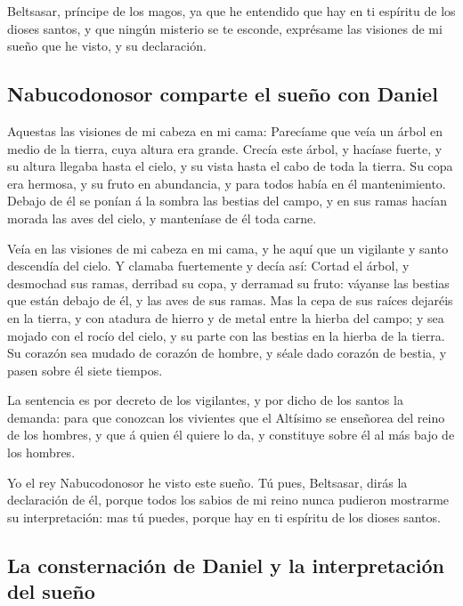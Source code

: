  Beltsasar, príncipe de los magos, ya que he entendido que
hay en ti espíritu de los dioses santos, y que ningún misterio se te
esconde, exprésame las visiones de mi sueño que he visto, y su
declaración.

\hypertarget{nabucodonosor-comparte-el-sueuxf1o-con-daniel}{%
\subsection{Nabucodonosor comparte el sueño con
Daniel}\label{nabucodonosor-comparte-el-sueuxf1o-con-daniel}}

 Aquestas las visiones de mi cabeza en mi cama: Parecíame
que veía un árbol en medio de la tierra, cuya altura era grande.
 Crecía este árbol, y hacíase fuerte, y su altura llegaba
hasta el cielo, y su vista hasta el cabo de toda la tierra.
 Su copa era hermosa, y su fruto en abundancia, y para
todos había en él mantenimiento. Debajo de él se ponían á la sombra las
bestias del campo, y en sus ramas hacían morada las aves del cielo, y
manteníase de él toda carne.

 Veía en las visiones de mi cabeza en mi cama, y he aquí
que un vigilante y santo descendía del cielo.  Y clamaba
fuertemente y decía así: Cortad el árbol, y desmochad sus ramas,
derribad su copa, y derramad su fruto: váyanse las bestias que están
debajo de él, y las aves de sus ramas.  Mas la cepa de sus
raíces dejaréis en la tierra, y con atadura de hierro y de metal entre
la hierba del campo; y sea mojado con el rocío del cielo, y su parte con
las bestias en la hierba de la tierra.  Su corazón sea
mudado de corazón de hombre, y séale dado corazón de bestia, y pasen
sobre él siete tiempos.

 La sentencia es por decreto de los vigilantes, y por dicho
de los santos la demanda: para que conozcan los vivientes que el
Altísimo se enseñorea del reino de los hombres, y que á quien él quiere
lo da, y constituye sobre él al más bajo de los hombres.

 Yo el rey Nabucodonosor he visto este sueño. Tú pues,
Beltsasar, dirás la declaración de él, porque todos los sabios de mi
reino nunca pudieron mostrarme su interpretación: mas tú puedes, porque
hay en ti espíritu de los dioses santos.

\hypertarget{la-consternaciuxf3n-de-daniel-y-la-interpretaciuxf3n-del-sueuxf1o}{%
\subsection{La consternación de Daniel y la interpretación del
sueño}\label{la-consternaciuxf3n-de-daniel-y-la-interpretaciuxf3n-del-sueuxf1o}}

